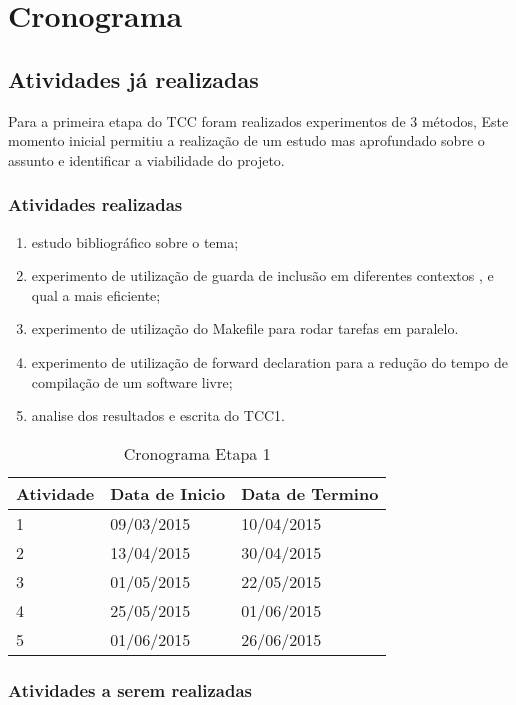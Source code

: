 \chapter[Cronograma]{Cronograma}

\section{Atividades já realizadas}

Para a primeira etapa do TCC foram realizados experimentos de 3 métodos,
 Este momento inicial permitiu a realização de um estudo mas aprofundado
 sobre o assunto e identificar a viabilidade do projeto.


\subsection{Atividades realizadas}

\begin{enumerate}
	\item		estudo bibliográfico sobre o tema;
	\item		experimento de utilização de guarda de inclusão em diferentes contextos , e qual a mais eficiente;
	\item		experimento de utilização do Makefile para rodar tarefas em paralelo.
	\item		experimento de utilização de forward declaration para a redução do tempo de compilação de um software livre;
	\item		analise dos resultados e escrita do TCC1.
\end{enumerate}

\begin{table}[h]
\centering
\begin{tabular}{lll}
\textbf{Atividade}& \textbf{Data de Inicio} & \textbf{Data de Termino}\\ \toprule
1 & 09/03/2015 & 10/04/2015 \\ \midrule 
2 & 13/04/2015 & 30/04/2015 \\ \midrule
3 & 01/05/2015 & 22/05/2015 \\ \midrule 
4 & 25/05/2015 & 01/06/2015 \\ \midrule
5 & 01/06/2015 & 26/06/2015 \\ \bottomrule
\end{tabular} 
\caption{Cronograma Etapa 1}
\label{cronograma1}
\end{table}

\subsection {Atividades a serem realizadas}

